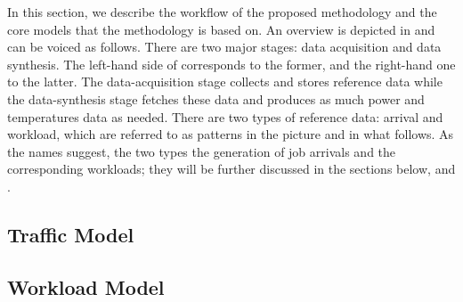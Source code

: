 
In this section, we describe the workflow of the proposed methodology and the
core models that the methodology is based on. An overview is depicted in
 and can be voiced as follows. There are two major stages:
data acquisition and data synthesis. The left-hand side of 
corresponds to the former, and the right-hand one to the latter. The
data-acquisition stage collects and stores reference data while the
data-synthesis stage fetches these data and produces as much power and
temperatures data as needed. There are two types of reference data: arrival and
workload, which are referred to as patterns in the picture and in what follows.
As the names suggest, the two types the generation of job arrivals and the
corresponding workloads; they will be further discussed in the sections below,
 and .


\subsection{Traffic Model} 


\subsection{Workload Model} 

